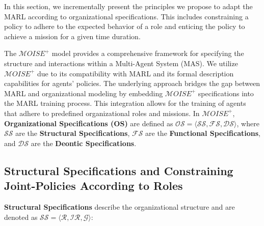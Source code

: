 \documentclass[sn-mathphys-num]{sn-jnl}%
\theoremstyle{thmstyleone}%
\theoremstyle{thmstyletwo}%
\theoremstyle{thmstylethree}%
\begin{document}
In this section, we incrementally present the principles we propose to adapt the MARL according to organizational specifications. This includes constraining a policy to adhere to the expected behavior of a role and enticing the policy to achieve a mission for a given time duration.


The $\mathcal{M}OISE^+$ model provides a comprehensive framework for specifying the structure and interactions within a Multi-Agent System (MAS). We utilize $\mathcal{M}OISE^+$ due to its compatibility with MARL and its formal description capabilities for agents' policies. The underlying approach bridges the gap between MARL and organizational modeling by embedding $\mathcal{M}OISE^+$ specifications into the MARL training process. This integration allows for the training of agents that adhere to predefined organizational roles and missions.
%
In $\mathcal{M}OISE^+$, \textbf{Organizational Specifications (OS)} are defined as $\mathcal{OS} = \langle \mathcal{SS}, \mathcal{FS}, \mathcal{DS} \rangle$, where $\mathcal{SS}$ are the \textbf{Structural Specifications}, $\mathcal{FS}$ are the \textbf{Functional Specifications}, and $\mathcal{DS}$ are the \textbf{Deontic Specifications}.

\subsection{Structural Specifications and Constraining Joint-Policies According to Roles}

\textbf{Structural Specifications} describe the organizational structure and are denoted as $\mathcal{SS} = \langle \mathcal{R}, \mathcal{IR}, \mathcal{G} \rangle$:
\end{document}
